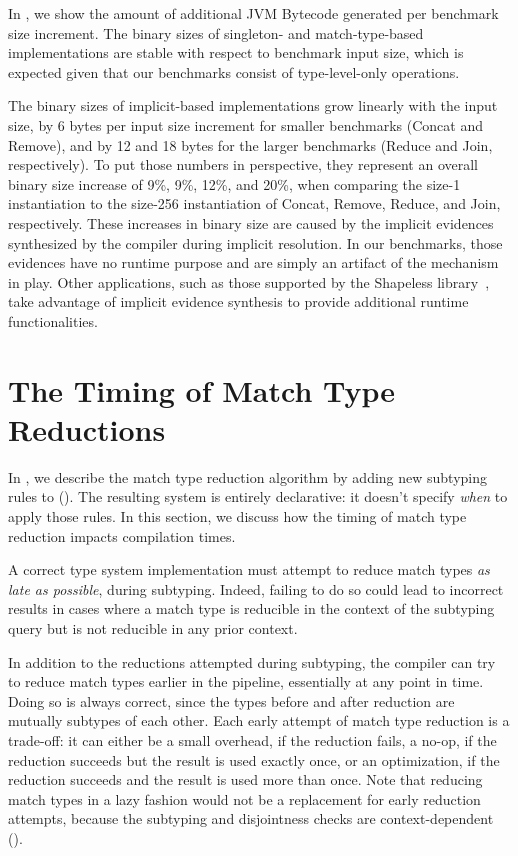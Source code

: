 In , we show the amount of additional JVM Bytecode generated per benchmark size increment.
The binary sizes of singleton- and match-type-based implementations are stable with respect to benchmark input size, which is expected given that our benchmarks consist of type-level-only operations.

The binary sizes of implicit-based implementations grow linearly with the input size, by 6 bytes per input size increment for smaller benchmarks (Concat and Remove), and by 12 and 18 bytes for the larger benchmarks (Reduce and Join, respectively).
To put those numbers in perspective, they represent an overall binary size increase of 9\%, 9\%, 12\%, and 20\%, when comparing the size-1 instantiation to the size-256 instantiation of Concat, Remove, Reduce, and Join, respectively.
These increases in binary size are caused by the implicit evidences synthesized by the compiler during implicit resolution.
In our benchmarks, those evidences have no runtime purpose and are simply an artifact of the mechanism in play.
Other applications, such as those supported by the Shapeless library~\citep{sabin2011shapeless}, take advantage of implicit evidence synthesis to provide additional runtime functionalities.

\section{The Timing of Match Type Reductions}
\label{sec:the-timing-of-match-type-reductions}

In , we describe the match type reduction algorithm by adding new subtyping rules to \SystemFsub ().
The resulting system is entirely declarative: it doesn't specify \emph{when} to apply those rules.
In this section, we discuss how the timing of match type reduction impacts compilation times.

A correct type system implementation must attempt to reduce match types \emph{as late as possible}, during subtyping.
Indeed, failing to do so could lead to incorrect results in cases where a match type is reducible in the context of the subtyping query but is not reducible in any prior context.

In addition to the reductions attempted during subtyping, the compiler can try to reduce match types earlier in the pipeline, essentially at any point in time.
Doing so is always correct, since the types before and after reduction are mutually subtypes of each other.
Each early attempt of match type reduction is a trade-off: it can either be a small overhead, if the reduction fails, a no-op, if the reduction succeeds but the result is used exactly once, or an optimization, if the reduction succeeds and the result is used more than once.
Note that reducing match types in a lazy fashion would not be a replacement for early reduction attempts, because the subtyping and disjointness checks are context-dependent ().

